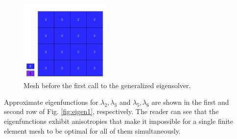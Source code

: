\documentclass[preprint ,12pt]{elsarticle}
\begin{document}
\begin{figure}[!ht]
\begin{center}
\includegraphics[width=0.4\textwidth]{img/mesh_1.png}
\end{center}
\vspace{-5mm}
\caption{Mesh before the first call to the generalized eigensolver.}
\label{fig:mesh1}
\end{figure}

Approximate eigenfunctions for $\lambda_2, \lambda_3$ and $\lambda_5, \lambda_6$
are shown in the first and second row of Fig. \ref{fig:eigen1}, respectively.
The reader can see that the eigenfunctions exhibit anisotropies that make it 
impossible for a single finite element mesh to be optimal for all 
of them simultaneously.
\end{document}
